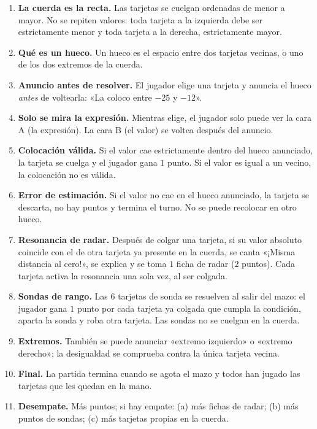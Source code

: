 \documentclass[12pt, letterpaper]{article}
\begin{document}
\begin{enumerate}[leftmargin=*]
  \item \textbf{La cuerda es la recta.} Las tarjetas se cuelgan ordenadas de menor a mayor. No se repiten valores: toda tarjeta a la izquierda debe ser estrictamente menor y toda tarjeta a la derecha, estrictamente mayor.
  \item \textbf{Qué es un hueco.} Un hueco es el espacio entre dos tarjetas vecinas, o uno de los dos extremos de la cuerda.
  \item \textbf{Anuncio antes de resolver.} El jugador elige una tarjeta y anuncia el hueco \emph{antes} de voltearla: «La coloco entre $-25$ y $-12$».
  \item \textbf{Solo se mira la expresión.} Mientras elige, el jugador solo puede ver la cara A (la expresión). La cara B (el valor) se voltea después del anuncio.
  \item \textbf{Colocación válida.} Si el valor cae estrictamente dentro del hueco anunciado, la tarjeta se cuelga y el jugador gana $1$ punto. Si el valor es igual a un vecino, la colocación no es válida.
  \item \textbf{Error de estimación.} Si el valor no cae en el hueco anunciado, la tarjeta se descarta, no hay puntos y termina el turno. No se puede recolocar en otro hueco.
  \item \textbf{Resonancia de radar.} Después de colgar una tarjeta, si su valor absoluto coincide con el de otra tarjeta ya presente en la cuerda, se canta «¡Misma distancia al cero!», se explica y se toma $1$ ficha de radar ($2$ puntos). Cada tarjeta activa la resonancia una sola vez, al ser colgada.
  \item \textbf{Sondas de rango.} Las 6 tarjetas de sonda se resuelven al salir del mazo: el jugador gana $1$ punto por cada tarjeta ya colgada que cumpla la condición, aparta la sonda y roba otra tarjeta. Las sondas no se cuelgan en la cuerda.
  \item \textbf{Extremos.} También se puede anunciar «extremo izquierdo» o «extremo derecho»; la desigualdad se comprueba contra la única tarjeta vecina.
  \item \textbf{Final.} La partida termina cuando se agota el mazo y todos han jugado las tarjetas que les quedan en la mano.
  \item \textbf{Desempate.} Más puntos; si hay empate: (a) más fichas de radar; (b) más puntos de sondas; (c) más tarjetas propias en la cuerda.
\end{enumerate}
\end{document}
